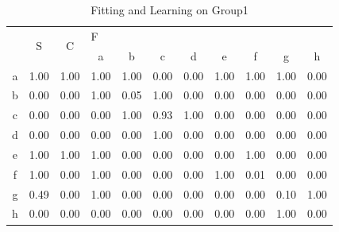 \begin{table}[]
\centering
\begin{tabular}{c|c|c|cccccccc}
\hline
\multirow{2}{*}{} & \multirow{2}{*}{S} & \multirow{2}{*}{C} & \multicolumn{8}{l}{F}                                 \\ \cline{4-11}
                  &                    &                    & a    & b    & c    & d    & e    & f    & g    & h    \\ \hline
a                 & 1.00               & 1.00               & 1.00 & 1.00 & 0.00 & 0.00 & 1.00 & 1.00 & 1.00 & 0.00 \\
b                 & 0.00               & 0.00               & 1.00 & 0.05 & 1.00 & 0.00 & 0.00 & 0.00 & 0.00 & 0.00 \\
c                 & 0.00               & 0.00               & 0.00 & 1.00 & 0.93 & 1.00 & 0.00 & 0.00 & 0.00 & 0.00 \\
d                 & 0.00               & 0.00               & 0.00 & 0.00 & 1.00 & 0.00 & 0.00 & 0.00 & 0.00 & 0.00 \\
e                 & 1.00               & 1.00               & 1.00 & 0.00 & 0.00 & 0.00 & 0.00 & 1.00 & 0.00 & 0.00 \\
f                 & 1.00               & 0.00               & 1.00 & 0.00 & 0.00 & 0.00 & 1.00 & 0.01 & 0.00 & 0.00 \\
g                 & 0.49               & 0.00               & 1.00 & 0.00 & 0.00 & 0.00 & 0.00 & 0.00 & 0.10 & 1.00 \\
h                 & 0.00               & 0.00               & 0.00 & 0.00 & 0.00 & 0.00 & 0.00 & 0.00 & 1.00 & 0.00 \\ \hline
\end{tabular}
\caption{Fitting and Learning on Group1}
\label{table:learning-group-1}
\end{table}

